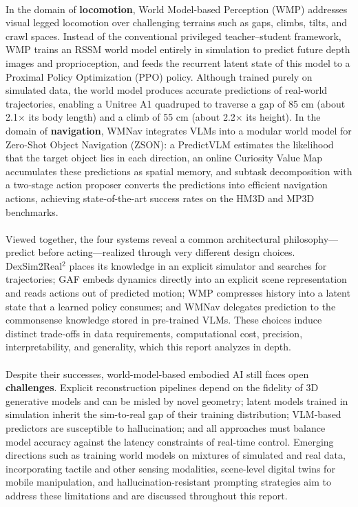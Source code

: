 \documentclass[12pt,a4paper,final]{extreport}
\begin{document}
\paragraph{} In the domain of \textbf{locomotion}, World Model-based Perception (WMP) \cite{p3} addresses visual legged locomotion over challenging terrains such as gaps, climbs, tilts, and crawl spaces. Instead of the conventional privileged teacher--student framework, WMP trains an RSSM world model entirely in simulation to predict future depth images and proprioception, and feeds the recurrent latent state of this model to a Proximal Policy Optimization (PPO) policy. Although trained purely on simulated data, the world model produces accurate predictions of real-world trajectories, enabling a Unitree A1 quadruped to traverse a gap of 85 cm (about 2.1$\times$ its body length) and a climb of 55 cm (about 2.2$\times$ its height). In the domain of \textbf{navigation}, WMNav \cite{p4} integrates VLMs into a modular world model for Zero-Shot Object Navigation (ZSON): a PredictVLM estimates the likelihood that the target object lies in each direction, an online Curiosity Value Map accumulates these predictions as spatial memory, and subtask decomposition with a two-stage action proposer converts the predictions into efficient navigation actions, achieving state-of-the-art success rates on the HM3D and MP3D benchmarks.

\paragraph{} Viewed together, the four systems reveal a common architectural philosophy---predict before acting---realized through very different design choices. DexSim2Real$^2$ places its knowledge in an explicit simulator and searches for trajectories; GAF embeds dynamics directly into an explicit scene representation and reads actions out of predicted motion; WMP compresses history into a latent state that a learned policy consumes; and WMNav delegates prediction to the commonsense knowledge stored in pre-trained VLMs. These choices induce distinct trade-offs in data requirements, computational cost, precision, interpretability, and generality, which this report analyzes in depth.

\paragraph{} Despite their successes, world-model-based embodied AI still faces open \textbf{challenges}. Explicit reconstruction pipelines depend on the fidelity of 3D generative models and can be misled by novel geometry; latent models trained in simulation inherit the sim-to-real gap of their training distribution; VLM-based predictors are susceptible to hallucination; and all approaches must balance model accuracy against the latency constraints of real-time control. Emerging directions such as training world models on mixtures of simulated and real data, incorporating tactile and other sensing modalities, scene-level digital twins for mobile manipulation, and hallucination-resistant prompting strategies aim to address these limitations and are discussed throughout this report.
\end{document}
